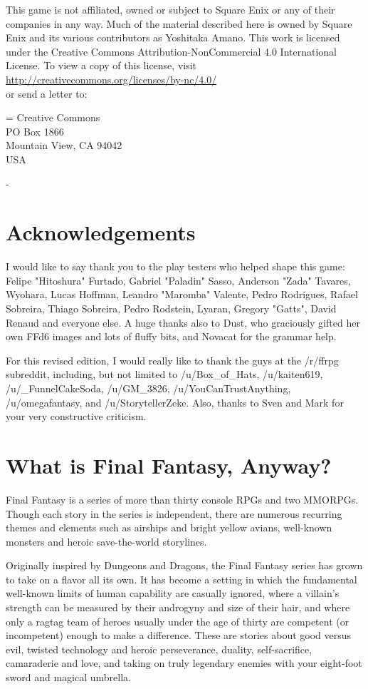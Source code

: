 \begin{multicols}{2}
This game is not affiliated, owned or subject to
Square Enix or any of their companies in any way.
Much of the material described here is owned by
Square Enix and its various contributors as Yoshitaka
Amano. This work is licensed under the Creative
Commons Attribution-NonCommercial 4.0 International
License. To view a copy of this license, visit\\
\url{http://creativecommons.org/licenses/by-nc/4.0/}\\
or send a letter to:

\hangindent=\parindent
Creative Commons\\
PO Box 1866\\
Mountain View, CA 94042\\
USA


- \ferrum
\end{multicols}
\newpage

\begin{multicols}{2}
\section*{Acknowledgements}
\label{sec:acknowledgements}
I would like to say thank you to the play
testers who helped shape this game: Felipe
"Hitoshura" Furtado, Gabriel "Paladin" Sasso,
Anderson "Zada" Tavares, Wyohara, Lucas
Hoffman, Leandro "Maromba" Valente, Pedro
Rodrigues, Rafael Sobreira, Thiago Sobreira, Pedro
Rodstein, Lyaran, Gregory "Gatts", David Renaud
and everyone else. A huge thanks also to Dust,
who graciously gifted her own FFd6 images and
lots of fluffy bits, and Novacat for the grammar
help. \pw

For this revised edition, I would really like to thank the guys at the /r/ffrpg subreddit, including, but not limited to /u/Box\_of\_Hats, /u/kaiten619, /u/\_FunnelCakeSoda, /u/GM\_3826, /u/YouCanTrustAnything, /u/omegafantasy, and /u/StorytellerZeke. Also, thanks to Sven and Mark for your very constructive criticism.

\section*{What is Final Fantasy, Anyway?}
\label{sec:whatff}
Final Fantasy is a series of more than thirty
console RPGs and two MMORPGs. Though each
story in the series is independent, there are
numerous recurring themes and elements such as
airships and bright yellow avians, well-known
monsters and heroic save-the-world storylines.

Originally inspired by Dungeons and
Dragons, the Final Fantasy series has grown to
take on a flavor all its own. It has become a setting
in which the fundamental well-known limits of
human capability are casually ignored, where a
villain’s strength can be measured by their
androgyny and size of their hair, and where only a
ragtag team of heroes usually under the age of
thirty are competent (or incompetent) enough to
make a difference. These are stories about good
versus evil, twisted technology and heroic
perseverance, duality, self-sacrifice, camaraderie
and love, and taking on truly legendary enemies
with your eight-foot sword and magical umbrella.
\end{multicols}